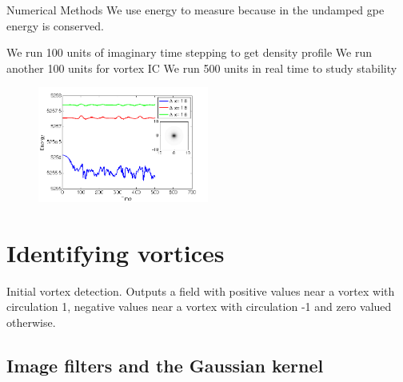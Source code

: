 \begin{chapter}{\label{cha:numerics}Numerical Methods}
	We use energy to measure because in the undamped gpe energy is conserved.

	We run 100 units of imaginary time stepping to get density profile
	We run another 100 units for vortex IC
	We run 500 units in real time to study stability


\begin{figure}
	\centering
	\includegraphics[width=0.5\textwidth]{numerics/figures/homg_energy_cons.png}
\end{figure}

\section{\label{section:vortexidentifying} Identifying vortices}

	\begin{algorithm}[H]
	\BlankLine


\caption{Initial vortex detection. Outputs a field with positive values near a vortex with circulation 1, negative values near a vortex with circulation -1 and zero valued otherwise.}\label{algo_calcvortexfield}
\end{algorithm}
\subsection{\label{section:gaussianblur} Image filters and the Gaussian kernel}
		\begin{algorithm}[H]
		\BlankLine


\end{algorithm}
\end{chapter}
